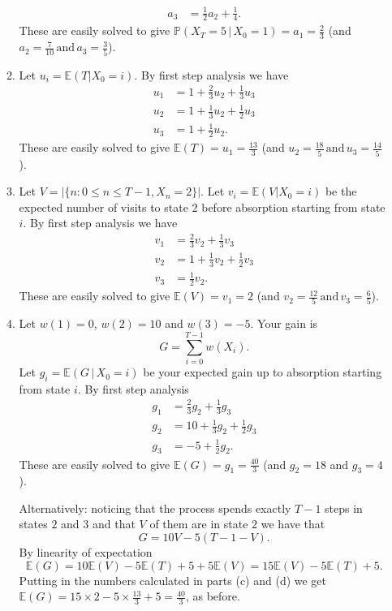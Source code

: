 \documentclass[11pt,a4paper]{report}
\begin{document}
\begin{enumerate}
\begin{enumerate}
\begin{align*}
                a_3 &= \frac{1}{2}a_2+\frac{1}{4}.
            \end{align*}
            These are easily solved to give $\mathbb{P}(X_T = 5\, |\, X_0 = 1) = a_1 = \frac{2}{3}$ (and $a_2 = \frac{7}{10} \, \text{and}\, a_3 = \frac{3}{5}$).
            \item Let $u_i = \mathbb{E}(T | X_0 = i)$. By first step analysis we have
        \begin{align*}
            u_1 &= 1 + \frac{2}{3}u_2 + \frac{1}{3}u_3\\
            u_2 &= 1 + \frac{1}{3}u_2 + \frac{1}{2}u_3\\
            u_3 &= 1 + \frac{1}{2}u_2.
        \end{align*}
        These are easily solved to give $\mathbb{E}(T) = u_1 = \frac{13}{3}$ (and $u_2 = \frac{18}{5} \, \text{and}\, u_3 = \frac{14}{5}$).
        \item Let $V = |\{n : 0 \leq n \leq T − 1, X_n = 2\}|$. Let $v_i = \mathbb{E}(V | X_0 = i)$ be the expected number of visits to state $2$ before absorption starting from state $i$. By first step analysis we have
        \begin{align*}
            v_1 &= \frac{2}{3}v_2 + \frac{1}{3}v_3\\
            v_2 &= 1 + \frac{1}{3}v_2 + \frac{1}{2}v_3\\
            v_3 &= \frac{1}{2}v_2.
        \end{align*}
        These are easily solved to give $\mathbb{E}(V ) = v_1 = 2$ (and $v_2 = \frac{12}{5}\,\text{and}\, v_3 = \frac{6}{5}$).
        \item Let $w(1) = 0$, $w(2) = 10$ and $w(3) = −5$. Your gain is $$G = \sum_{i=0}^{T-1}w(X_i).$$ Let $g_i = \mathbb{E}(G\, |\, X_0 = i)$ be your expected gain up to absorption starting from state $i$. By first step analysis
        \begin{align*}
            g_1 &= \frac{2}{3}g_2+\frac{1}{3}g_3\\
            g_2 &= 10+\frac{1}{3}g_2+\frac{1}{2}g_3\\
            g_3 &= -5+\frac{1}{2}g_2.
        \end{align*}
        These are easily solved to give $\mathbb{E}(G) = g_1 = \frac{40}{3}$ (and $g_2 = 18$ and $g_3 = 4$).\par
        Alternatively: noticing that the process spends exactly $T − 1$ steps in states $2$ and $3$ and that $V$ of them are in state $2$ we have that $$G = 10V-5(T-1-V).$$ By linearity of expectation $$\mathbb{E}(G) = 10\mathbb{E}(V ) − 5\mathbb{E}(T) + 5 + 5\mathbb{E}(V) = 15 \mathbb{E}(V) − 5\mathbb{E}(T) + 5.$$ Putting in the numbers calculated in parts (c) and (d) we get $\mathbb{E}(G) = 15 \times 2 − 5 \times \frac{13}{3} + 5 = \frac{40}{3}$, as before.

\end{enumerate}
\end{enumerate}
\end{document}
